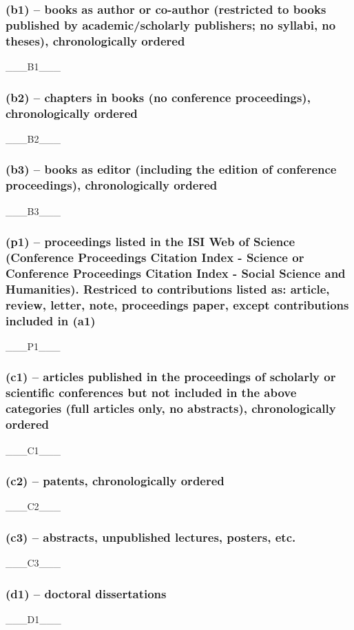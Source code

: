 \documentclass[a4paper,10pt]{article}
\begin{document}
\subsubsection*{(b1) -- books as author or co-author (restricted to books published by academic/scholarly publishers; no syllabi, no theses), chronologically ordered}
{___B1___}

\subsubsection*{(b2) -- chapters in books (no conference proceedings), chronologically ordered}
{___B2___}

\subsubsection*{(b3) -- books as editor (including the edition of conference proceedings), chronologically ordered}
{___B3___}

\subsubsection*{(p1) -- proceedings listed in the ISI Web of Science (Conference Proceedings Citation Index - Science or Conference Proceedings Citation Index - Social Science and Humanities). Restriced to contributions listed as: article, review, letter, note, proceedings paper, except contributions included in (a1)}
{___P1___}

\subsubsection*{(c1) -- articles published in the proceedings of scholarly or scientific conferences but not included in the above categories (full articles only, no abstracts), chronologically ordered}
{___C1___}

\subsubsection*{(c2) -- patents, chronologically ordered}
{___C2___}

\subsubsection*{(c3) -- abstracts, unpublished lectures, posters, etc.}
{___C3___}

\subsubsection*{(d1) -- doctoral dissertations}
{___D1___}
\end{document}

